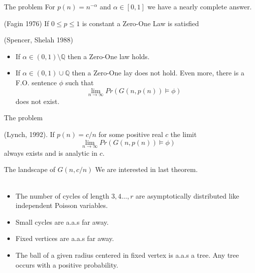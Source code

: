 \documentclass[handout, 11pt]{beamer}
\newcommand{\Ln}{\lim\limits_{n\to \infty}}
\begin{document}
\begin{frame}{The problem}	
For $p(n)=n^{-\alpha}$ and $\alpha\in [0,1]$ we have a nearly complete answer.
\begin{theorem}{(Fagin 1976)} If $0\leq p \leq 1$ is constant a Zero-One Law is satisfied
\end{theorem}
\begin{theorem}{(Spencer, Shelah 1988)} 
	\begin{itemize}
		\item If $\alpha \in (0,1)\setminus \mathbb{Q}$ then
		a Zero-One law holds.
		\item If $\alpha \in (0,1)\cup \mathbb{Q}$ then a Zero-One
		lay does not hold. Even more, there is a F.O. sentence
		$\phi$ such that
		\[ \Ln Pr(G(n,p(n))\models \phi) \]   
		does not exist.
	\end{itemize}
\end{theorem}

\end{frame}

\begin{frame}{The problem}
\begin{theorem}{(Lynch, 1992).} 
	If $p(n)=c/n$ for some positive real $c$
	the limit
	\[ \Ln Pr(G(n,p(n))\models \phi)\]
	always exists and is analytic in $c$.  
\end{theorem}
\end{frame}

\begin{frame}{The landscape of $G(n,c/n)$}
	We are interested in last theorem.\\~\\
	\begin{itemize}
		\item The number of cycles of 
		length $3,4\dots, r$
		are asymptotically distributed like independent Poisson 
		variables.
		\item Small cycles are a.a.s far away.
		\item Fixed vertices are a.a.s far away.
		\item The ball of a given radius centered in fixed
		vertex is a.a.s a tree. Any tree occurs with a positive 
		probability.
	\end{itemize}
\end{frame}
\end{document}
